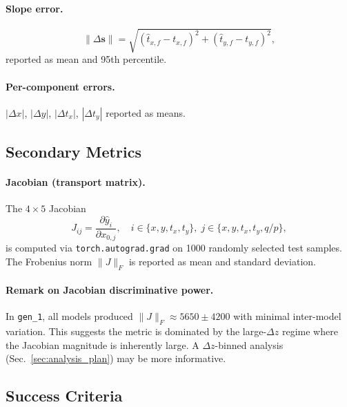 \documentclass[a4paper,11pt]{article}
\newcommand{\dz}{\Delta z}
\begin{document}
\paragraph{Slope error.}
\begin{equation}
  \|\Delta \mathbf{s}\| = \sqrt{(\hat{t}_{x,f} - t_{x,f})^2
    + (\hat{t}_{y,f} - t_{y,f})^2},
  \label{eq:slope_err}
\end{equation}
reported as mean and 95th percentile.

\paragraph{Per-component errors.}
$|\Delta x|$, $|\Delta y|$, $|\Delta t_x|$, $|\Delta t_y|$ reported
as means.

\subsection{Secondary Metrics}

\paragraph{Jacobian (transport matrix).}
The $4 \times 5$ Jacobian
\begin{equation}
  J_{ij} = \frac{\partial \hat{y}_i}{\partial x_{0,j}},
  \quad i \in \{x, y, t_x, t_y\},\;
  j \in \{x, y, t_x, t_y, q/p\},
  \label{eq:jacobian}
\end{equation}
is computed via \texttt{torch.autograd.grad} on 1000 randomly selected
test samples.  The Frobenius norm $\|J\|_F$ is reported as mean and
standard deviation.

\paragraph{Remark on Jacobian discriminative power.}
In \texttt{gen\_1}, all models produced $\|J\|_F \approx 5650 \pm 4200$
with minimal inter-model variation.  This suggests the metric is
dominated by the large-$\dz$ regime where the Jacobian magnitude is
inherently large.  A $\dz$-binned analysis (Sec.~\ref{sec:analysis_plan})
may be more informative.

\subsection{Success Criteria}
\label{sec:success}
\end{document}
